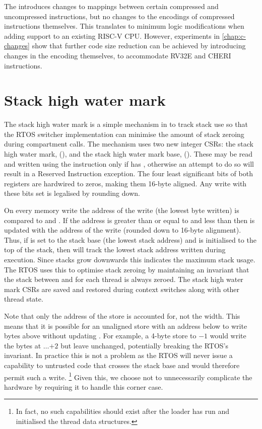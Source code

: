 The \cherimcuisa{} introduces changes to mappings between certain compressed and uncompressed instructions, but no changes to the encodings of compressed instructions themselves.
This translates to minimum logic modifications when adding \cherimcuisa{} support to an existing RISC-V CPU.
However, experiments in \cref{chap:c-changes} show that further code size reduction can be achieved by introducing changes in the encoding themselves, to accommodate RV32E and CHERI instructions.

\section{Stack high water mark}
\label{sec:shwm}

The stack high water mark is a simple mechanism in \cherimcu{} to track stack use so that the RTOS switcher implementation can minimise the amount of stack zeroing during compartment calls.
The mechanism uses two new integer CSRs: the stack high water mark, \mshwm{} (), and the stack high water mark base, \mshwmb{} ().
These may be read and written using the  instruction only if \PCC{} has \cappermASR{}, otherwise an attempt to do so will result in a Reserved Instruction exception.
The four least significant bits of both registers are hardwired to zeros, making them 16-byte aligned.
Any write with these bits set is legalised by rounding down.

On every memory write the address of the write (the lowest byte written) is compared to \mshwm{} and \mshwmb{}.
If the address is greater than or equal to \mshwmb{} and less than \mshwm{} then \mshwm{} is updated with the address of the write (rounded down to 16-byte alignment).
Thus, if \mshwmb{} is set to the stack base (the lowest stack address) and \mshwm{} is initialised to the top of the stack, then \mshwm{} will track the lowest stack address written during execution.
Since stacks grow downwards this indicates the maximum stack usage.
The RTOS uses this to optimise stack zeroing by maintaining an invariant that the stack between \mshwmb{} and \mshwm{} for each thread is always zeroed.
The stack high water mark CSRs are saved and restored during context switches along with other thread state.

Note that only the address of the store is accounted for, not the width.
This means that it is possible for an unaligned store with an address below \mshwmb{} to write bytes above \mshwmb{} without updating \mshwm{}.
For example, a 4-byte store to \mshwmb{}$ - 1$ would write the bytes at \mshwmb{}$\dots{}$\mshwmb$+ 2$ but leave \mshwm{} unchanged, potentially breaking the RTOS's invariant.
In practice this is not a problem as the RTOS will never issue a capability to untrusted code that crosses the stack base and would therefore permit such a write.%
\footnote{In fact, no such capabilities should exist after the loader has run and initialised the thread data structures.}
Given this, we choose not to unnecessarily complicate the hardware by requiring it to handle this corner case.

